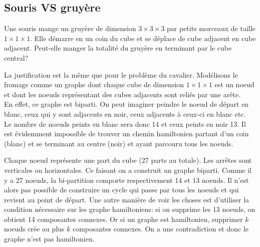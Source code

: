 \subsection{Souris VS gruyère}
Une souris mange un gruyère de dimension $3 \times 3 \times 3$ par petits morceaux de taille $1 \times 1 \times 1$. Elle démarre en un coin du cube et se déplace de cube adjacent en cube adjacent. Peut-elle manger la totalité du gruyère en terminant par le cube central?
\begin{solution}
La justification est la même que pour le problème du cavalier. Modélisons le fromage comme un graphe dont chaque cube de dimension $1 \times 1 \times 1$ est un noeud et dont les noeuds représentant des cubes adjacents sont reliés par une arête.\\
En effet, ce graphe est biparti. On peut imaginer peindre le noeud de départ en blanc, ceux qui y sont adjacents en noir, ceux adjacents à ceux-ci en blanc etc.\\
Le nombre de noeuds peints en blanc sera donc 14 et ceux peints en noir 13. Il est évidemment impossible de trouver un chemin hamiltonien partant d'un coin (blanc) et se terminant au centre (noir) et ayant parcouru tous les noeuds.
\end{solution}

\begin{solution}
Chaque noeud représente une part du cube (27 parts au totale). Les arrêtes sont verticales ou horizontales. Ce faisant on a construit un graphe biparti. Comme il y a 27 noeuds, la bi-partition comporte respectivement 14 et 13 noeuds. Il n'est alors pas possible de construire un cycle qui passe par tous les noeuds et qui revient au point de départ. Une autre manière de voir les choses est d'utiliser la condition nécessaire sur les graphe hamiltoniens: si on supprime les 13 noeuds, on obtient 14 composantes connexes. Or si un graphe est hamiltonien, supprimer $k$ noeuds crée au plus $k$ composantes connexes. On a une contradiction et donc le graphe n'est pas hamiltonien.
\end{solution}

